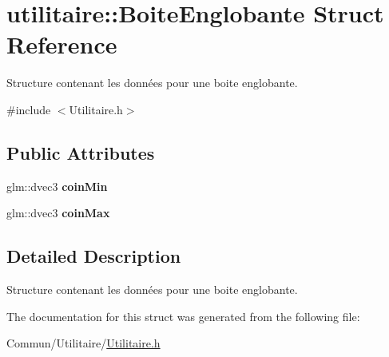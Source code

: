 \hypertarget{structutilitaire_1_1_boite_englobante}{}\section{utilitaire\+:\+:Boite\+Englobante Struct Reference}
\label{structutilitaire_1_1_boite_englobante}


Structure contenant les données pour une boite englobante.  




{\ttfamily \#include $<$Utilitaire.\+h$>$}

\subsection*{Public Attributes}
\begin{DoxyCompactItemize}
\item 
\hypertarget{structutilitaire_1_1_boite_englobante_a083f953a1ac5a830f70a2173a092e90a}{}glm\+::dvec3 {\bfseries coin\+Min}\label{structutilitaire_1_1_boite_englobante_a083f953a1ac5a830f70a2173a092e90a}

\item 
\hypertarget{structutilitaire_1_1_boite_englobante_af6f6d9ef23f6e5eb9f2f1ed6dd4d3e0e}{}glm\+::dvec3 {\bfseries coin\+Max}\label{structutilitaire_1_1_boite_englobante_af6f6d9ef23f6e5eb9f2f1ed6dd4d3e0e}

\end{DoxyCompactItemize}


\subsection{Detailed Description}
Structure contenant les données pour une boite englobante. 

The documentation for this struct was generated from the following file\+:\begin{DoxyCompactItemize}
\item 
Commun/\+Utilitaire/\hyperlink{_utilitaire_8h}{Utilitaire.\+h}\end{DoxyCompactItemize}
